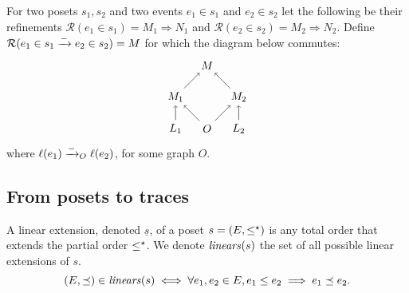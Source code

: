 \begin{definition}
\label{def:ref_neg_infl}
  For two posets $s_1,s_2$ and two events $e_1\in s_1$ and $e_2\in s_2$ let the following be their refinements $\mathcal{R}(e_1\in s_1) = M_1\Rightarrow N_1$ and $\mathcal{R}(e_2\in s_2) = M_2\Rightarrow N_2$. Define $\mathcal{R}(e_1\in s_1\mathrel{\xrightarrow{-}} e_2\in s_2) = M$ for which the diagram below commutes:
  \[
  \begin{tikzpicture} %
    \node (o) at (0,0) {\(O\)};
    \node (n) at (0,2) {\(M\)};
    \node (l1) at (-1,0) {\(L_1\)};
    \node (l2) at (1,0) {\(L_2\)};
    \node (n1) at (-1,1) {\(M_1\)};
    \node (n2) at (1,1) {\(M_2\)};
    \draw [->] (l1) -- (n1);
    \draw [->] (l2) -- (n2);
    \draw [->] (o) -- (n1);
    \draw [->] (o) -- (n2);
    \draw [->] (n1) -- (n);
    \draw [->] (n2) -- (n);
  \end{tikzpicture}
  \]
  where $\ell(e_1)\mathrel{\xrightarrow{-}}_O\ell(e_2)$, for some graph $O$.
\end{definition}

\subsection{From posets to traces}

\begin{definition}
  A linear extension, denoted $\underline{s}$, of a poset $s=(E,\leq^{\star})$ is any total order that extends the partial order $\leq^{\star}$. We denote $\mathit{linears}(s)$ the set of all possible linear extensions of $s$.
  \[
  (E,\preceq)\in\mathit{linears}(s) \iff \forall e_1,e_2\in E, e_1\leq e_2\implies e_1\preceq e_2.
  \]
\end{definition}

